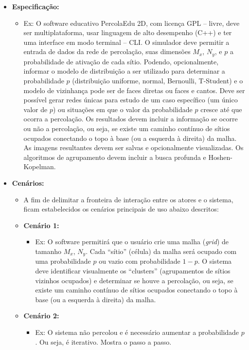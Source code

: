 \documentclass[12pt,a4paper]{article}
\begin{document}
\begin{itemize}[leftmargin=*]
\begin{itemize}
    \item \textbf{Especificação:}
    \begin{itemize}
      \item Ex: O software educativo PercolaEdu 2D, com licença GPL -- livre, deve ser multiplataforma, usar linguagem de alto desempenho (C++) e ter uma interface em modo terminal -- CLI. O simulador deve permitir a entrada de dados da rede de percolação, suas dimensões $M_x$, $N_y$, e $p$ a probabilidade de ativação de cada sítio. Podendo, opcionalmente, informar o modelo de distribuição a ser utilizado para determinar a probabilidade $p$ (distribuição uniforme, normal, Bernoulli, T-Student) e o modelo de vizinhança pode ser de faces diretas ou faces e cantos. Deve ser possível gerar redes únicas para estudo de um caso específico (um único valor de $p$) ou situações em que o valor da probabilidade $p$ cresce até que ocorra a percolação. Os resultados devem incluir a informação se ocorre ou não a percolação, ou seja, se existe um caminho contínuo de sítios ocupados conectando o topo à base (ou a esquerda à direita) da malha. As imagens resultantes devem ser salvas e opcionalmente visualizadas. Os algoritmos de agrupamento devem incluir a busca profunda e Hoshen-Kopelman.
    \end{itemize}

    \item \textbf{Cenários:}
    \begin{itemize}
      \item A fim de delimitar a fronteira de interação entre os atores e o sistema, ficam estabelecidos os cenários principais de uso abaixo descritos:

      \item \textbf{Cenário 1:}
      \begin{itemize}
        \item Ex: O software permitirá que o usuário crie uma malha (\textit{grid}) de tamanho $M_x$, $N_y$. Cada ``sítio'' (célula) da malha será ocupado com uma probabilidade $p$ ou vazio com probabilidade $1-p$. O sistema deve identificar visualmente os ``clusters'' (agrupamentos de sítios vizinhos ocupados) e determinar se houve a percolação, ou seja, se existe um caminho contínuo de sítios ocupados conectando o topo à base (ou a esquerda à direita) da malha.
      \end{itemize}

      \item \textbf{Cenário 2:}
      \begin{itemize}
        \item Ex: O sistema não percolou e é necessário aumentar a probabilidade $p$. Ou seja, é iterativo. Mostra o passo a passo.
      \end{itemize}
    \end{itemize}


\end{itemize}
\end{itemize}
\end{document}
